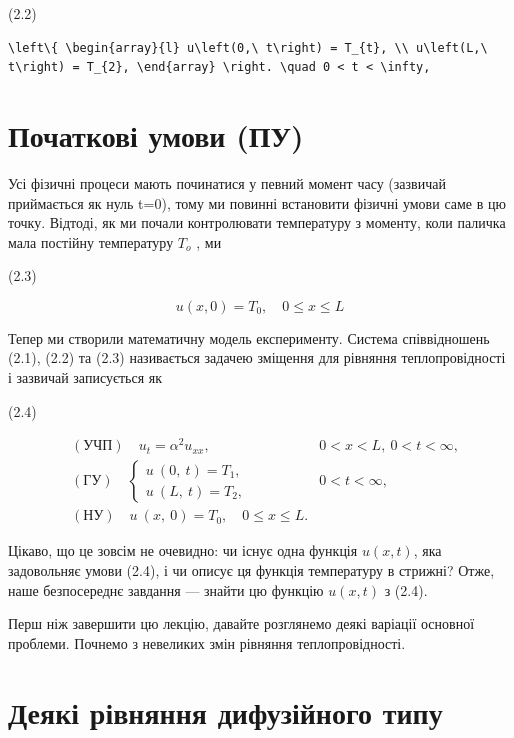 \documentclass[
  ukrainian,
]{article}
\begin{document}
(2.2)

\begin{verbatim}
\left\{ \begin{array}{l} u\left(0,\ t\right) = T_{t}, \\ u\left(L,\ t\right) = T_{2}, \end{array} \right. \quad 0 < t < \infty,
\end{verbatim}

\section{Початкові умови
(ПУ)}\label{ux43fux43eux447ux430ux442ux43aux43eux432ux456-ux443ux43cux43eux432ux438-ux43fux443}

Усі фізичні процеси мають починатися у певний момент часу (зазвичай
приймається як нуль t=0), тому ми повинні встановити фізичні умови саме
в цю точку. Відтоді, як ми почали контролювати температуру з моменту,
коли паличка мала постійну температуру \(T_{\mathrm{ }o}\) , ми

(2.3)

\[
u(x, 0) = T_0, \quad 0 \le x \le L
\]

Тепер ми створили математичну модель експерименту. Система співвідношень
(2.1), (2.2) та (2.3) називається задачею зміщення для рівняння
теплопровідності і зазвичай записується як

(2.4)

\[
\begin{aligned} & (\text{УЧП}) \quad u_t = \alpha^2 u_{xx}, & 0 < x < L, \ 0 < t < \infty, \\ & (\text{ГУ}) \quad \begin{cases} u \ (0, \ t) = T_1, \\ u \ (L, \ t) = T_2, \end{cases} & 0 < t < \infty, \\ & (\text{НУ}) \quad u \ (x, \ 0) = T_0, \quad 0 \leqslant x \leqslant L. \end{aligned}
\]

Цікаво, що це зовсім не очевидно: чи існує одна функція \(u(x, t)\), яка
задовольняє умови (2.4), і чи описує ця функція температуру в стрижні?
Отже, наше безпосереднє завдання --- знайти цю функцію \(u(x, t)\) з
(2.4).

Перш ніж завершити цю лекцію, давайте розглянемо деякі варіації основної
проблеми. Почнемо з невеликих змін рівняння теплопровідності.

\section{Деякі рівняння дифузійного
типу}\label{ux434ux435ux44fux43aux456-ux440ux456ux432ux43dux44fux43dux43dux44f-ux434ux438ux444ux443ux437ux456ux439ux43dux43eux433ux43e-ux442ux438ux43fux443}
\end{document}
